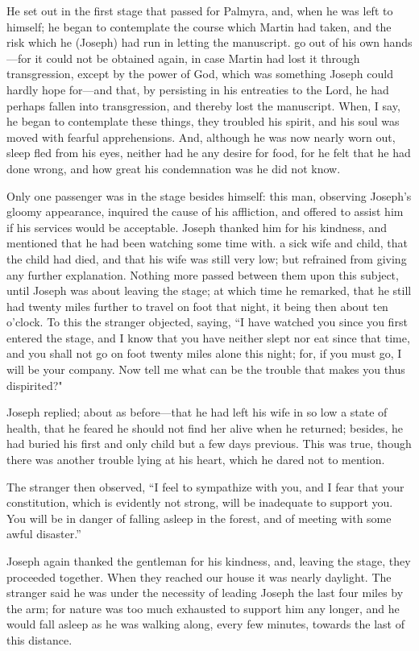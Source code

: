 		He set out in the first stage that passed for Palmyra, and, when he was left to himself; he began to contemplate the course which Martin had taken, and the risk which he (Joseph) had run in letting the manuscript. go out of his own hands---for it could not be obtained again, in case Martin had lost it through transgression, except by the power of God, which was something Joseph could hardly hope for---and that, by persisting in his entreaties to the Lord, he had perhaps fallen into transgression, and thereby lost the manuscript. When, I say, he began to contemplate these things, they troubled his spirit, and his soul was moved with fearful apprehensions. And, although he was now nearly worn out, sleep fled from his eyes, neither had he any desire for food, for he felt that he had done wrong, and how great his condemnation was he did not know.

		Only one passenger was in the stage besides himself: this man, observing Joseph's gloomy appearance, inquired the cause of his affliction, and offered to assist him if his services would be acceptable. Joseph thanked him for his kindness, and mentioned that he had been watching some time with. a sick wife and child, that the child had died, and that his wife was still very low; but refrained from giving any further explanation. Nothing more passed between them upon this subject, until Joseph was about leaving the stage; at which time he remarked, that he still had twenty miles further to travel on foot that night, it being then about ten o'clock. To this the stranger objected, saying, ``I have watched you since you first entered the stage, and I know that you have neither slept nor eat since that time, and you shall not go on foot twenty miles alone this night; for, if you must go, I will be your company. Now tell me what can be the trouble that makes you thus dispirited?"

		Joseph replied; about as before---that he had left his wife in so low a state of health, that he feared he should not find her alive when he returned; besides, he had buried his first and only child but a few days previous. This was true, though there was another trouble lying at his heart, which he dared not to mention.

		The stranger then observed, ``I feel to sympathize with you, and I fear that your constitution, which is evidently not strong, will be inadequate to support you. You will be in danger of falling asleep in the forest, and of meeting with some awful disaster.''

		Joseph again thanked the gentleman for his kindness, and, leaving the stage, they proceeded together. When they reached our house it was nearly daylight. The stranger said he was under the necessity of leading Joseph the last four miles by the arm; for nature was too much exhausted to support him any longer, and he would fall asleep as he was walking along, every few minutes, towards the last of this distance.

